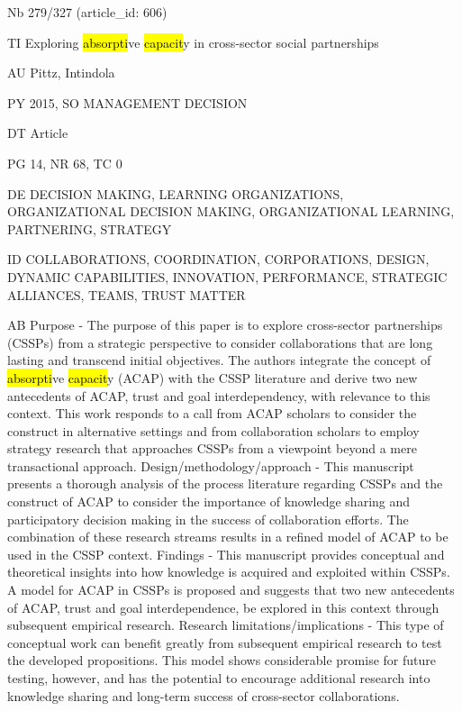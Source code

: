\documentclass[a4paper]{article}
\begin{document}
\vspace*{-2cm}
Nb \tabto{0cm}279/327 (article\_id: 606)\par
TI \tabto{0cm}Exploring \hl{absorpti}ve \hl{capacit}y in cross-sector social partnerships\par
AU \tabto{0cm}Pittz, Intindola\par
PY \tabto{0cm}2015, SO MANAGEMENT DECISION\par
DT \tabto{0cm}Article\par
PG \tabto{0cm}14, NR 68, TC 0\par
DE \tabto{0cm}DECISION MAKING, LEARNING ORGANIZATIONS, ORGANIZATIONAL DECISION MAKING, ORGANIZATIONAL LEARNING, PARTNERING, STRATEGY\par
ID \tabto{0cm}COLLABORATIONS, COORDINATION, CORPORATIONS, DESIGN, DYNAMIC CAPABILITIES, INNOVATION, PERFORMANCE, STRATEGIC ALLIANCES, TEAMS, TRUST MATTER\par
AB \tabto{0cm}Purpose - The purpose of this paper is to explore cross-sector partnerships (CSSPs) from a strategic perspective to consider collaborations that are long lasting and transcend initial objectives. The authors integrate the concept of \hl{absorpti}ve \hl{capacit}y (ACAP) with the CSSP literature and derive two new antecedents of ACAP, trust and goal interdependency, with relevance to this context. This work responds to a call from ACAP scholars to consider the construct in alternative settings and from collaboration scholars to employ strategy research that approaches CSSPs from a viewpoint beyond a mere transactional approach.
Design/methodology/approach - This manuscript presents a thorough analysis of the process literature regarding CSSPs and the construct of ACAP to consider the importance of knowledge sharing and participatory decision making in the success of collaboration efforts. The combination of these research streams results in a refined model of ACAP to be used in the CSSP context.
Findings - This manuscript provides conceptual and theoretical insights into how knowledge is acquired and exploited within CSSPs. A model for ACAP in CSSPs is proposed and suggests that two new antecedents of ACAP, trust and goal interdependence, be explored in this context through subsequent empirical research.
Research limitations/implications - This type of conceptual work can benefit greatly from subsequent empirical research to test the developed propositions. This model shows considerable promise for future testing, however, and has the potential to encourage additional research into knowledge sharing and long-term success of cross-sector collaborations.
\end{document}
